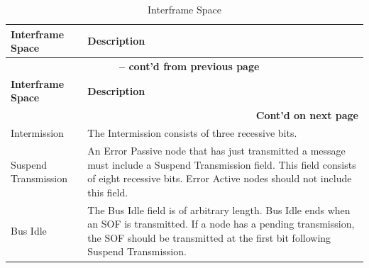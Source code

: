 \begin{longtable}[c]{|p{4cm}|p{11cm}|} 
  \caption{Interframe Space}
  \label{tab:twai-interframe-space} 
  \\\hline
  \rowcolor{lightgray}
  \textbf{Interframe Space} & \textbf{Description}
  \\\hline
  \endfirsthead
  
  \multicolumn{2}{c}{\bfseries \tablename\ \thetable{} -- cont'd from previous page}\\  \hline
  
  \rowcolor{lightgray}
    \textbf{Interframe Space} & \textbf{Description}
  \\\hline
  \endhead
  
  \multicolumn{2}{r}{\textbf{Cont'd on next page}} \\
  \endfoot
  \endlastfoot

    Intermission\label{table_item:ifg} & The Intermission consists of three recessive bits.
           \\\hline
    Suspend Transmission & An Error Passive node that has just transmitted a message must include a Suspend Transmission field. This field consists of eight recessive bits. Error Active nodes should not include this field.
            \\\hline
    Bus Idle & The Bus Idle field is of arbitrary length. Bus Idle ends when an SOF is transmitted. If a node has a pending transmission, the SOF should be transmitted at the first bit following Suspend Transmission.         
            \\\hline
    
\end{longtable}
